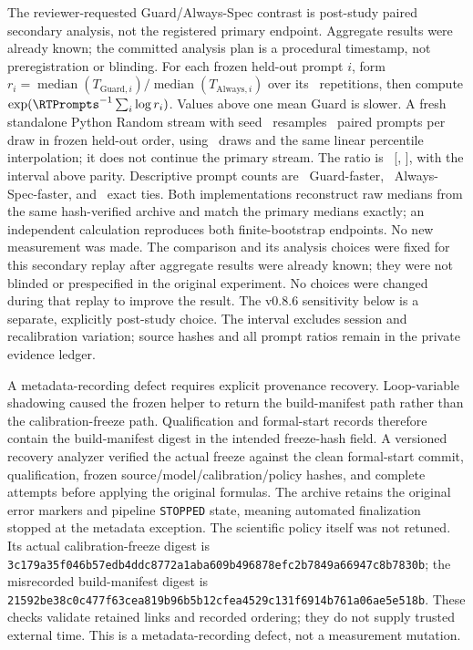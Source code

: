 \documentclass{article}
\begin{document}
The reviewer-requested Guard/Always-Spec contrast is post-study paired secondary analysis, not the registered primary endpoint. Aggregate results were already known; the committed analysis plan is a procedural timestamp, not preregistration or blinding. For each frozen held-out prompt $i$, form $r_i=\operatorname{median}(T_{\mathrm{Guard},i})/\operatorname{median}(T_{\mathrm{Always},i})$ over its \RTReps\ repetitions, then compute $\exp(\RTPrompts^{-1}\sum_i\log r_i)$. Values above one mean Guard is slower. A fresh standalone Python Random stream with seed \RTSeed\ resamples \RTPrompts\ paired prompts per draw in frozen held-out order, using \RTBootstrap\ draws and the same linear percentile interpolation; it does not continue the primary stream. The ratio is \RTSecondary\ [\RTSecondaryLo, \RTSecondaryHi], with the interval above parity. Descriptive prompt counts are \RTGuardFaster\ Guard-faster, \RTAlwaysFaster\ Always-Spec-faster, and \RTTies\ exact ties. Both implementations reconstruct raw medians from the same hash-verified archive and match the primary medians exactly; an independent calculation reproduces both finite-bootstrap endpoints. No new measurement was made. The comparison and its analysis choices were fixed for this secondary replay after aggregate results were already known; they were not blinded or prespecified in the original experiment. No choices were changed during that replay to improve the result. The v0.8.6 sensitivity below is a separate, explicitly post-study choice. The interval excludes session and recalibration variation; source hashes and all prompt ratios remain in the private evidence ledger.

A metadata-recording defect requires explicit provenance recovery. Loop-variable shadowing caused the frozen helper to return the build-manifest path rather than the calibration-freeze path. Qualification and formal-start records therefore contain the build-manifest digest in the intended freeze-hash field. A versioned recovery analyzer verified the actual freeze against the clean formal-start commit, qualification, frozen source/model/calibration/policy hashes, and complete attempts before applying the original formulas. The archive retains the original error markers and pipeline \texttt{STOPPED} state, meaning automated finalization stopped at the metadata exception. The scientific policy itself was not retuned. Its actual calibration-freeze digest is \nolinkurl{3c179a35f046b57edb4ddc8772a1aba609b496878efc2b7849a66947c8b7830b}; the misrecorded build-manifest digest is \nolinkurl{21592be38c0c477f63cea819b96b5b12cfea4529c131f6914b761a06ae5e518b}. These checks validate retained links and recorded ordering; they do not supply trusted external time. This is a metadata-recording defect, not a measurement mutation.
\end{document}
